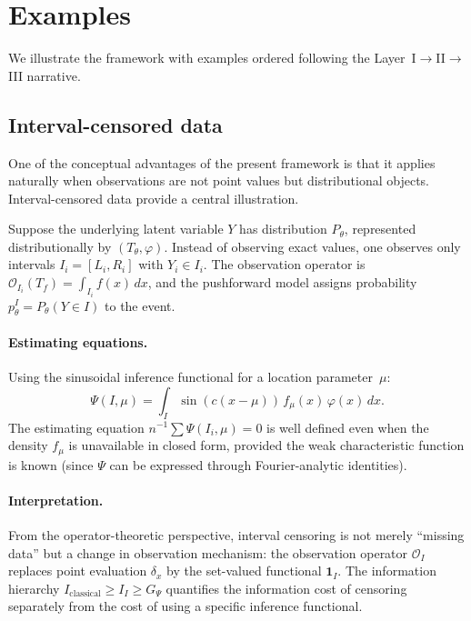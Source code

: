 \documentclass[11pt,a4paper]{article}
\begin{document}
\section{Examples}\label{sec:examples}

We illustrate the framework with examples ordered following the
Layer~I$\to$II$\to$III narrative.

\subsection{Interval-censored data}\label{subsec:interval-censored}

One of the conceptual advantages of the present framework is that it
applies naturally when observations are not point values but distributional
objects.  Interval-censored data provide a central illustration.

Suppose the underlying latent variable $Y$ has distribution $P_\theta$,
represented distributionally by $(T_\theta, \varphi)$.  Instead of observing
exact values, one observes only intervals $I_i = [L_i, R_i]$ with
$Y_i \in I_i$.  The observation operator is
$\mathcal O_{I_i}(T_f) = \int_{I_i} f(x)\,dx$, and the pushforward model
assigns probability $p_\theta^I = P_\theta(Y \in I)$ to the event.

\paragraph{Estimating equations.}
Using the sinusoidal inference functional for a location parameter~$\mu$:
\[
\Psi(I, \mu)
= \int_I \sin(c(x - \mu))\,f_\mu(x)\,\varphi(x)\,dx.
\]
The estimating equation $n^{-1}\sum \Psi(I_i, \mu) = 0$ is well defined
even when the density $f_\mu$ is unavailable in closed form, provided the
weak characteristic function is known (since
$\Psi$ can be expressed through Fourier-analytic identities).

\paragraph{Interpretation.}
From the operator-theoretic perspective, interval censoring is not merely
``missing data'' but a change in observation mechanism: the observation
operator $\mathcal O_I$ replaces point evaluation $\delta_x$ by the
set-valued functional $\mathbf{1}_I$.  The information hierarchy
$I_{\mathrm{classical}} \geq I_I \geq G_\Psi$ quantifies the information
cost of censoring separately from the cost of using a specific inference
functional.
\end{document}

